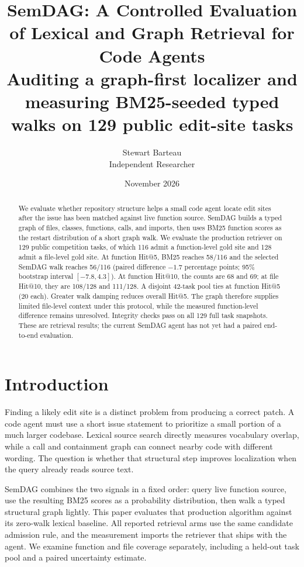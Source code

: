 \documentclass[11pt]{article}
\title{SemDAG: A Controlled Evaluation of Lexical and Graph Retrieval for Code Agents\\[0.45em]
\large\normalfont Auditing a graph-first localizer and measuring BM25-seeded typed walks on 129 public edit-site tasks}
\author{Stewart Barteau\\Independent Researcher}
\date{November 2026}
\begin{document}
\maketitle

\begin{abstract}
We evaluate whether repository structure helps a small code agent locate edit sites after the issue has been matched against live function source. SemDAG builds a typed graph of files, classes, functions, calls, and imports, then uses BM25 function scores as the restart distribution of a short graph walk. We evaluate the production retriever on 129 public competition tasks, of which 116 admit a function-level gold site and 128 admit a file-level gold site. At function Hit@5, BM25 reaches 58/116 and the selected SemDAG walk reaches 56/116 (paired difference $-1.7$ percentage points; 95\% bootstrap interval $[-7.8,4.3]$). At function Hit@10, the counts are 68 and 69; at file Hit@10, they are 108/128 and 111/128. A disjoint 42-task pool ties at function Hit@5 (20 each). Greater walk damping reduces overall Hit@5. The graph therefore supplies limited file-level context under this protocol, while the measured function-level difference remains unresolved. Integrity checks pass on all 129 full task snapshots. These are retrieval results; the current SemDAG agent has not yet had a paired end-to-end evaluation.
\end{abstract}

\section{Introduction}
Finding a likely edit site is a distinct problem from producing a correct patch. A code agent must use a short issue statement to prioritize a small portion of a much larger codebase. Lexical source search directly measures vocabulary overlap, while a call and containment graph can connect nearby code with different wording. The question is whether that structural step improves localization when the query already reads source text.

SemDAG combines the two signals in a fixed order: query live function source, use the resulting BM25 scores as a probability distribution, then walk a typed structural graph lightly. This paper evaluates that production algorithm against its zero-walk lexical baseline. All reported retrieval arms use the same candidate admission rule, and the measurement imports the retriever that ships with the agent. We examine function and file coverage separately, including a held-out task pool and a paired uncertainty estimate.
\end{document}
